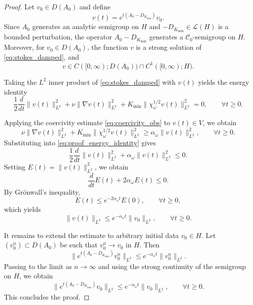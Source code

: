 \documentclass[10pt,a4paper]{amsart}
\begin{document}
\begin{proof}
Let $v_0\in D(A_0)$ and define
\[
v(t)=e^{t(A_0-D_{K_{\min}})}v_0.
\]
Since $A_0$ generates an analytic semigroup on $H$ and
$-D_{K_{\min}}\in\mathcal L(H)$ is a bounded perturbation, the operator
$A_0-D_{K_{\min}}$ generates a $\mathcal C_0$-semigroup on $H$.
Moreover, for $v_0\in D(A_0)$, the function $v$ is a strong solution of
\eqref{eq:stokes_damped}, and
\[
v\in C([0,\infty);D(A_0))\cap C^1([0,\infty);H).
\]

Taking the $L^2$ inner product of \eqref{eq:stokes_damped} with $v(t)$ yields
the energy identity
\begin{equation}
\label{eq:proof_energy_identity}
\frac12\frac{d}{dt}\|v(t)\|_{L^2}^2
+
\nu\|\nabla v(t)\|_{L^2}^2
+
K_{\min}\|\chi_\omega^{1/2}v(t)\|_{L^2}^2
=0,
\qquad \forall t\ge0.
\end{equation}

Applying the coercivity estimate \eqref{eq:coercivity_obs} to $v(t)\in V$, we obtain
\[
\nu\|\nabla v(t)\|_{L^2}^2
+
K_{\min}\|\chi_\omega^{1/2}v(t)\|_{L^2}^2
\ge
\alpha_\omega\|v(t)\|_{L^2}^2,
\qquad \forall t\ge0.
\]
Substituting into \eqref{eq:proof_energy_identity} gives
\[
\frac12\frac{d}{dt}\|v(t)\|_{L^2}^2
+
\alpha_\omega\|v(t)\|_{L^2}^2
\le 0.
\]
Setting $E(t)=\|v(t)\|_{L^2}^2$, we obtain
\[
\frac{d}{dt}E(t)+2\alpha_\omega E(t)\le0.
\]
By Gr\"onwall's inequality,
\[
E(t)\le e^{-2\alpha_\omega t}E(0),
\qquad \forall t\ge0,
\]
which yields
\[
\|v(t)\|_{L^2}
\le
e^{-\alpha_\omega t}\|v_0\|_{L^2},
\qquad \forall t\ge0.
\]

It remains to extend the estimate to arbitrary initial data $v_0\in H$.
Let $(v_0^n)\subset D(A_0)$ be such that $v_0^n\to v_0$ in $H$.
Then
\[
\|e^{t(A_0-D_{K_{\min}})}v_0^n\|_{L^2}
\le
e^{-\alpha_\omega t}\|v_0^n\|_{L^2}.
\]
Passing to the limit as $n\to\infty$ and using the strong continuity of the
semigroup on $H$, we obtain
\[
\|e^{t(A_0-D_{K_{\min}})}v_0\|_{L^2}
\le
e^{-\alpha_\omega t}\|v_0\|_{L^2},
\qquad \forall t\ge0.
\]
This concludes the proof.
\end{proof}
\end{document}
